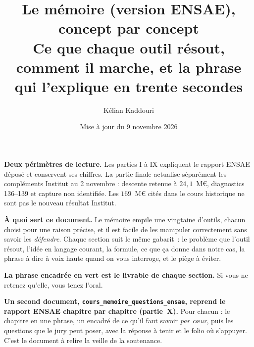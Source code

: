 

\title{\vspace{-1.3cm}\color{navy}\bfseries Le mémoire (version ENSAE), concept par concept\\[3pt]
  \large Ce que chaque outil résout, comment il marche,
  et la phrase qui l'explique en trente secondes}
\author{Kélian Kaddouri}
\date{Mise à jour du 9 novembre 2026}


\maketitle
\vspace{-0.8cm}

\begin{cle}
\textbf{Deux périmètres de lecture.} Les parties I à IX expliquent le rapport ENSAE déposé et
conservent ses chiffres. La partie finale actualise séparément les compléments Institut au
2 novembre : descente retenue à $24{,}1$~M\euro{}, diagnostics 136--139 et capture non identifiée.
Les $169$~M\euro{} cités dans le cours historique ne sont pas le nouveau résultat Institut.

\textbf{À quoi sert ce document.} Le mémoire empile une vingtaine d'outils, chacun choisi
pour une raison précise, et il est facile de les manipuler correctement sans savoir les
\emph{défendre}. Chaque section suit le même gabarit~: le problème que l'outil résout,
l'idée en langage courant, la formule, ce que ça donne dans notre cas, la phrase à dire à
voix haute quand on vous interroge, et le piège à éviter.

\textbf{La phrase encadrée en vert est le livrable de chaque section.} Si vous ne retenez
qu'elle, vous tenez l'oral.

\textbf{Un second document, \texttt{cours\_memoire\_questions\_ensae}, reprend le rapport ENSAE chapitre par chapitre (partie~X).} Pour chacun : le chapitre en une
phrase, un encadré de ce qu'il faut savoir \emph{par c\oe ur}, puis les questions que le jury peut
poser, avec la réponse à tenir et le folio où s'appuyer. C'est le document à relire la veille de la
soutenance.
\end{cle}

